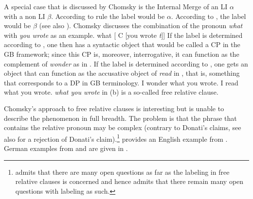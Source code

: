A special case that is discussed by Chomsky is the Internal Merge of an LI
$\alpha$ with a non LI  $\beta$. According to rule  the label would be $\alpha$. According
to , the label would be $\beta$ (see also ). Chomsky discusses the combination of the
pronoun \emph{what} with \emph{you wrote} as an example.
\ea
\label{ex-what-you-wrote}
what [ C [you wrote \emph{t}]]
\z
If the label is determined according to , one then has a syntactic object that would be
called a CP in the GB framework; since this CP is, moreover, interrogative, it can function as the
complement of \emph{wonder} as in . If the label is determined according to , one gets an
object that can function as the accusative object of \emph{read} in , that is, something
that corresponds to a DP in GB terminology.
\eal
\ex I wonder what you wrote.
\ex\label{ex-i-read-what-you-wrote} I read what you wrote.
\zl
\emph{what you wrote} in (b) is a so-called free relative clause.



Chomsky's approach to free relative clauses is interesting but is unable to describe the phenomenon in
full breadth. The problem is that the phrase that contains the relative pronoun may be
complex (contrary to Donati's claims, see also  for a rejection of
Donati's claim).\footnote{%
\citet[]{Chomsky2013a} admits that there are many open questions as far as the labeling in free relative
clauses is concerned and hence admits that there remain many open questions with labeling as such.
}  provides an English example from \citet[]{BG78a}. German
examples from  and  are given in .


